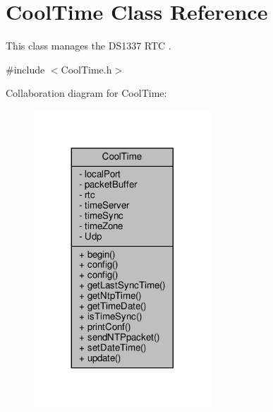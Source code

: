 \hypertarget{classCoolTime}{}\section{Cool\+Time Class Reference}
\label{classCoolTime}


This class manages the D\+S1337 R\+TC .  




{\ttfamily \#include $<$Cool\+Time.\+h$>$}



Collaboration diagram for Cool\+Time\+:
\nopagebreak
\begin{figure}[H]
\begin{center}
\leavevmode
\includegraphics[width=188pt]{classCoolTime__coll__graph}
\end{center}
\end{figure}
